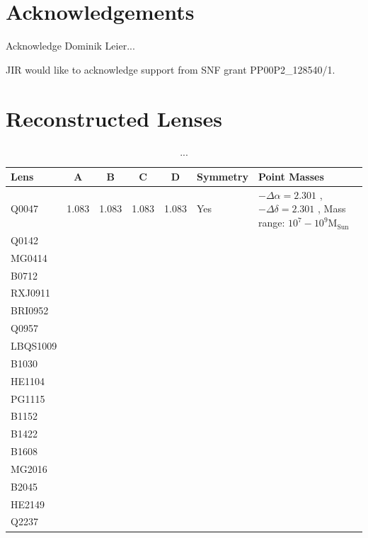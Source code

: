 \documentclass[useAMS,usenatbib]{mn2e}
\begin{document}
\section{Acknowledgements}\label{sec:acknowledgements}
Acknowledge Dominik Leier...

JIR would like to acknowledge support from SNF grant PP00P2\_128540/1.




\appendix
\section{Reconstructed Lenses}\label{sec:reconstructions}

\begin{table}
 \begin{center}
  \begin{tabular}{l c c c c l l}
   Lens & A & B & C & D & Symmetry & Point Masses\\ \hline \hline
   Q0047 & 1.083 & 1.083 & 1.083 & 1.083 & Yes & $-\Delta\alpha = 2.301$ , $-\Delta\delta = 2.301$ , Mass range: $10^{7}-10^{9} \mathrm{M_{Sun}}$\\
   Q0142 & & & & & & \\
   MG0414 & & & & & & \\
   B0712 & & & & & & \\
   RXJ0911 & & & & & & \\
   BRI0952 & & & & & & \\
   Q0957 & & & & & & \\
   LBQS1009 & & & & & & \\
   B1030 & & & & & & \\
   HE1104 & & & & & & \\
   PG1115 & & & & & \\
   B1152 & & & & & \\
   B1422 & & & & & \\
   B1608 & & & & & \\
   MG2016 & & & & & \\
   B2045 & & & & & \\
   HE2149 & & & & & \\
   Q2237 & & & & & \\
  \end{tabular}
  \caption{...}
  \label{tab:lensparameters}
 \end{center}
\end{table}
\end{document}
